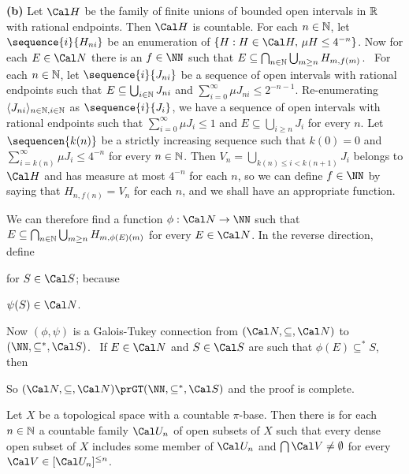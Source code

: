 {{\bf (b)} Let $\Cal H$ be the family of finite unions of bounded open
intervals in $\Bbb R$ with rational endpoints.   Then $\Cal H$ is
countable.   For each $n\in\Bbb N$, let $\sequence{i}{H_{ni}}$ be an
enumeration of $\{H:H\in\Cal H,\,\mu H\le 4^{-n}\}$.   Now for each
$E\in\Cal N$ there is an $f\in\NN$ such that
$E\subseteq\bigcap_{n\in\Bbb N}\bigcup_{m\ge n}H_{m,f(m)}$.   \Prf\ For
each $n\in\Bbb N$, let $\sequence{i}{J_{ni}}$ be a sequence of open
intervals with rational endpoints
such that $E\subseteq\bigcup_{i\in\Bbb N}J_{ni}$ and
$\sum_{i=0}^{\infty}\mu J_{ni}\le 2^{-n-1}$.   Re-enumerating
$\langle J_{ni}\rangle_{n\in\Bbb N,i\in\Bbb N}$ as $\sequence{i}{J_i}$,
we have a sequence of open intervals with rational endpoints such that
$\sum_{i=0}^{\infty}\mu J_i\le 1$ and $E\subseteq\bigcup_{i\ge n}J_i$
for every $n$.   Let $\sequencen{k(n)}$ be a strictly increasing
sequence such that $k(0)=0$ and
$\sum_{i=k(n)}^{\infty}\mu J_i\le 4^{-n}$ for every $n\in\Bbb N$.   Then
$V_n=\bigcup_{k(n)\le i<k(n+1)}J_i$ belongs to $\Cal H$ and has measure
at most $4^{-n}$ for each $n$, so we can define $f\in\NN$ by saying that
$H_{n,f(n)}=V_n$ for each $n$, and we shall have an appropriate
function.\ \Qed

We can therefore find a function $\phi:\Cal N\to\NN$ such that
$E\subseteq\bigcap_{n\in\Bbb N}\bigcup_{m\ge n}H_{m,\phi(E)(m)}$ for
every $E\in\Cal N$.   In the reverse direction, define


\noindent for $S\in\Cal S$;  because


\noindent $\psi(S)\in\Cal N$.

Now $(\phi,\psi)$ is a Galois-Tukey connection from
$(\Cal N,\subseteq,\Cal N)$ to $(\NN,\subseteq^*,\Cal S)$.   \Prf\ If
$E\in\Cal N$ and $S\in\Cal S$ are such that $\phi(E)\subseteq^*S$, then


\noindent So $(\Cal N,\subseteq,\Cal N)\prGT(\NN,\subseteq^*,\Cal S)$
and the proof is complete.
}%

 Let $X$ be a topological
space with a countable $\pi$-base.   Then there is for each $n\in\Bbb N$
a countable family $\Cal U_n$ of open subsets of $X$ such
that every dense open subset of $X$
includes some member of $\Cal U_n$ and $\bigcap\Cal V\ne\emptyset$ for every
$\Cal V\in[\Cal U_n]^{\le n}$.

